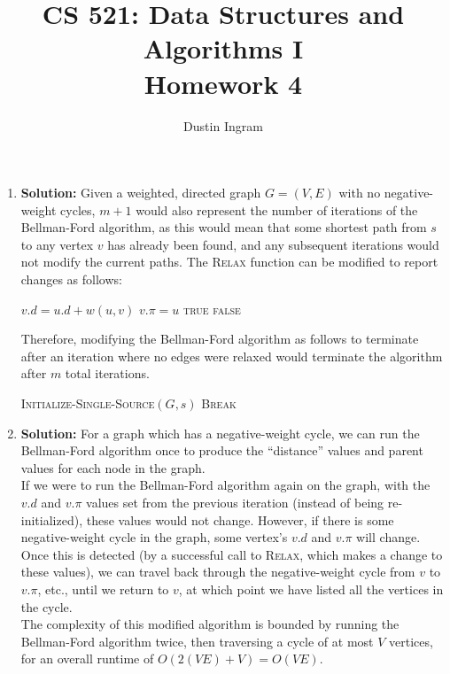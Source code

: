 \documentclass{article}
\title{CS 521: Data Structures and Algorithms I \\ Homework 4}
\author{Dustin Ingram}
\begin{document}
\maketitle
\begin{enumerate}
\item \textbf{Solution:}
Given a weighted, directed graph $G=(V,E)$ with no negative-weight cycles, $m+1$ would also represent the number of iterations of the Bellman-Ford algorithm, as this would mean that some shortest path from $s$ to any vertex $v$ has already been found, and any subsequent iterations would not modify the current paths. The \textsc{Relax} function can be modified to report changes as follows:
\begin{algorithm}[H]
\caption{}
\begin{algorithmic}
    \STATE $v.d = u.d + w(u,v)$
    \STATE $v.\pi = u$
    \RETURN \textsc{true}
\ENDIF
\RETURN \textsc{false}
\end{algorithmic}
\end{algorithm}
Therefore, modifying the Bellman-Ford algorithm as follows to terminate after an iteration where no edges were relaxed would terminate the algorithm after $m$ total iterations.
\begin{algorithm}[H]
\caption{}
\begin{algorithmic}
\STATE \textsc{Initialize-Single-Source}$(G,s)$
        \STATE \textsc{Break} 
    \ENDIF
\ENDFOR
\end{algorithmic}
\end{algorithm}

\item \textbf{Solution:} 
For a graph which has a negative-weight cycle, we can run the Bellman-Ford algorithm once to produce the ``distance'' values and parent values for each node in the graph. \\
If we were to run the Bellman-Ford algorithm again on the graph, with the $v.d$ and $v.\pi$ values set from the previous iteration (instead of being re-initialized), these values would not change. However, if there is some negative-weight cycle in the graph, some vertex's $v.d$ and $v.\pi$ will change.\\
Once this is detected (by a successful call to \textsc{Relax}, which makes a change to these values), we can travel back through the negative-weight cycle from $v$ to $v.\pi$, etc., until we return to $v$, at which point we have listed all the vertices in the cycle.\\
The complexity of this modified algorithm is bounded by running the Bellman-Ford algorithm twice, then traversing a cycle of at most $V$ vertices, for an overall runtime of $O(2(VE)+V)=O(VE)$.


\end{enumerate}
\end{document}

